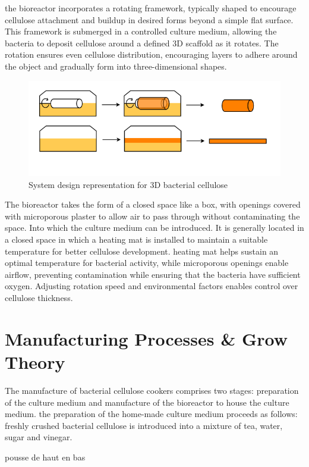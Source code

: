 the bioreactor incorporates a rotating framework, typically shaped to encourage cellulose attachment and buildup in desired forms beyond a simple flat surface. This framework is submerged in a controlled culture medium, allowing the bacteria to deposit cellulose around a defined 3D scaffold as it rotates. The rotation ensures even cellulose distribution, encouraging layers to adhere around the object and gradually form into three-dimensional shapes.
\begin{figure}[h]
    \centering
    \includegraphics{images/shema3Dscoby.png}
    \caption{System design representation for 3D bacterial cellulose}
    \label{fig:diagBC3D}
\end{figure} 

The bioreactor takes the form of a closed space like a box, with openings covered with microporous plaster to allow air to pass through without contaminating the space. Into which the culture medium can be introduced.
It is generally located in a closed space in which a heating mat is installed to maintain a suitable temperature for better cellulose development. 
heating mat helps sustain an optimal temperature for bacterial activity, while microporous openings enable airflow, preventing contamination while ensuring that the bacteria have sufficient oxygen. Adjusting rotation speed and environmental factors enables control over cellulose thickness.


\section{Manufacturing Processes \& Grow Theory}

The manufacture of bacterial cellulose cookers comprises two stages: preparation of the culture medium and manufacture of the bioreactor to house the culture medium. 
the preparation of the home-made culture medium proceeds as follows:
freshly crushed bacterial cellulose is introduced into a mixture of tea, water, sugar and vinegar. 

pousse de haut en bas 

